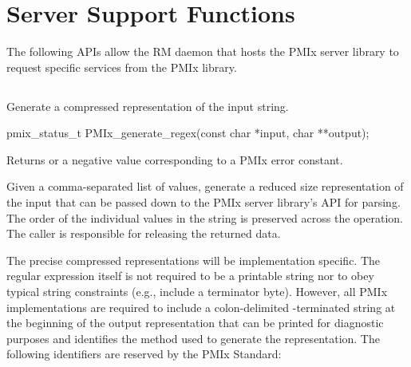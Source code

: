 \section{Server Support Functions}

The following \acp{API} allow the \ac{RM} daemon that hosts the \ac{PMIx} server library to request specific services from the \ac{PMIx} library.

\subsection{}

\summary

Generate a compressed representation of the input string.

\format

\cspecificstart
\begin{codepar}
pmix_status_t
PMIx_generate_regex(const char *input, char **output);
\end{codepar}
\cspecificend

\begin{arglist}
\end{arglist}

Returns  or a negative value corresponding to a PMIx error constant.

\descr

Given a comma-separated list of  values, generate a reduced size representation of the input that can be passed down to the \ac{PMIx} server library's  \ac{API} for parsing. The order of the individual values in the  string is preserved across the operation. The caller is responsible for releasing the returned data.

\label{regex:fmt}The precise compressed representations will be implementation specific. The regular expression itself is not required to be a printable string nor to obey typical string constraints (e.g., include a  terminator byte). However, all \ac{PMIx} implementations are required to include a colon-delimited -terminated string at the beginning of the output representation that can be printed for diagnostic purposes and identifies the method used to generate the representation. The following identifiers are reserved by the \ac{PMIx} Standard:

